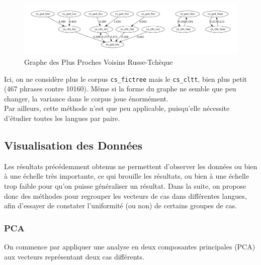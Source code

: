 \documentclass{cours}
\begin{document}
\begin{figure}[H]
	\centering
	\includegraphics[width=\textwidth]{Figures/GNN/gnn_ru_gsd_cs_cltt}
	\caption{Graphe des Plus Proches Voisins Russe-Tchèque}
	\label{GNNRuCz}
\end{figure}

Ici, on ne considère plus le corpus \texttt{cs\_fictree} mais le \texttt{cs\_cltt}, bien plus petit (467 phrases contre 10160).
Même si la forme du graphe ne semble que peu changer, la variance dans le corpus joue énormément.\\
Par ailleurs, cette méthode n'est que peu applicable, puisqu'elle nécessite d'étudier toutes les langues par paire.

\subsection{Visualisation des Données}\label{subsec:vis}
Les résultats précédemment obtenus ne permettent d'observer les données ou bien à une échelle très importante, ce qui brouille les résultats, ou bien à une échelle trop faible pour qu'on puisse généraliser un résultat.
Dans la suite, on propose donc des méthodes pour regrouper les vecteurs de cas dans différentes langues, afin d'essayer de constater l'uniformité (ou non) de certains groupes de cas.

\subsubsection{PCA}\label{subsub:pca}
On commence par appliquer une analyse en deux composantes principales (PCA) aux vecteurs représentant deux cas différents.
\end{document}
